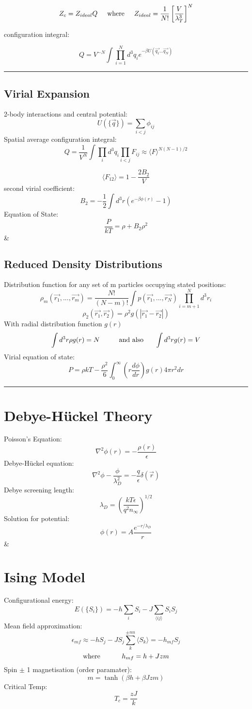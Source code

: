 \documentclass[table,cmyk]{article}
\begin{document}
\begin{longtable}
\[Z_c = Z_{ideal} Q \textmd{\hspace{0.5cm}where\hspace{0.5cm}} Z_{ideal} = \frac{1}{N!}\left[\frac{V}{\lambda_{T}^3}\right]^N\]

configuration integral:

\[Q = V^{-N}\int \prod_{i=1}^{N} d^3q_i e^{-\beta U(\vec{q_1}...\vec{q_N})}\]
\noindent\rule{7.8cm}{0.4pt}
\subsection*{Virial Expansion}
2-body interactions and central potential:
\[U(\{\vec{q}\}) = \sum_{i<j} \phi_{ij}\]
Spatial average configuration integral:
\[ Q = \frac{1}{V^N} \int \prod_{i} d^3q_i \prod_{i<j}F_{ij} \approx \langle F\rangle^{N(N-1)/2}\]

\[\langle F_{12} \rangle = 1 - \frac{2B_2}{V}\]
second virial coefficient:
\[B_2 = -\frac{1}{2} \int d^3r (e^{-\beta \phi(r)}-1)\]
Equation of State:
\[ \frac{P}{kT} = \rho + B_2 \rho^2\]
&
\subsection*{Reduced Density Distributions}
Distribution function for any set of m particles occupying stated positions:
\[\rho_m(\vec{r_1},...,\vec{r_m}) = \frac{N!}{(N-m)!}\int p(\vec{r_1},...,\vec{r_N}) \prod_{i=m+1}^{N} d^3r_i\]
\[\rho_2(\vec{r_1},\vec{r_2}) = \rho^2g(|\vec{r_1}-\vec{r_2}|)\]
With radial distribution function $g(r)$
\[ \int d^3r\rho g(r) = N \textmd{\hspace{1cm}and also\hspace{0.6cm}} \int d^3rg(r) = V\]
Virial equation of state:
\[P = \rho kT - \frac{\rho^2}{6} \int_{0}^{\infty} \left( r \frac{d\phi}{dr}\right) g(r) 4\pi r^2 dr\]
\noindent\rule{7.8cm}{0.4pt}
\section*{Debye-H\"uckel Theory}
Poisson's Equation:
\[\nabla ^2 \phi(r) = -\frac{\rho(r)}{\epsilon}\]
Debye-H\"uckel equation:
\[ \nabla^2 \phi - \frac{\phi}{\lambda_{D}^2} = -\frac{q}{\epsilon} \delta(\vec{r})\]
Debye screening length:
\[ \lambda_D = \left( \frac{kT\epsilon}{q^2n_{\infty}}\right)^{1/2}\]
Solution for potential:
\[ \phi(r) = A\frac{e^{-r/\lambda_D}}{r}\]
&
\section*{Ising Model}
Configurational energy:
\[ E(\{S_i\}) = -h \sum_{i} S_i - J \sum_{\langle ij\rangle}S_i S_j\]
Mean field approximation:
\[\epsilon_{mf} \approx -hS_j - J S_j \sum_{k}^{\pm nn} \langle S_k \rangle = - h_{mf}S_j\]
\[\textmd{where \hspace{1cm}} h_{mf} = h + Jzm\]
Spin $\pm$ 1 magnetisation (order paramater):
\[ m = \tanh(\beta h + \beta Jzm)\]
Critical Temp:
\[T_c = \frac{zJ}{k}\]
\tabularnewline\hline

\end{longtable}
\end{document}
